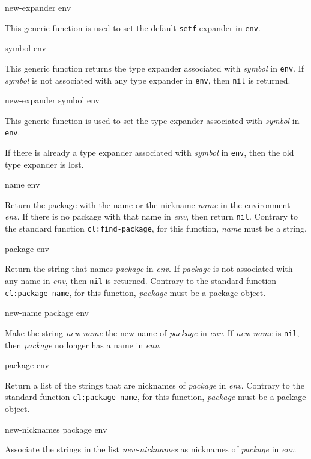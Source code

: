  {new-expander env}

This generic function is used to set the default \texttt{setf}
expander in \texttt{env}.

 {symbol env}

This generic function returns the type expander associated with
\textit{symbol} in \texttt{env}.  If \textit{symbol} is not associated
with any type expander in \texttt{env}, then \texttt{nil} is returned.

 {new-expander symbol env}

This generic function is used to set the type expander associated
with \textit{symbol} in \texttt{env}.

If there is already a type expander associated with \textit{symbol} in
\texttt{env}, then the old type expander is lost.

 {name env}

Return the package with the name or the nickname \textit{name} in the
environment \textit{env}.  If there is no package with that name
in \textit{env}, then return \texttt{nil}.  Contrary to
the standard \commonlisp{} function \texttt{cl:find-package}, for this
function, \textit{name} must be a string.

 {package env}

Return the string that names \textit{package} in \textit{env}.
If \textit{package} is not associated with any name in \textit{env},
then \texttt{nil} is returned.  Contrary to the standard \commonlisp{}
function \texttt{cl:package-name}, for this function, \textit{package}
must be a package object.

 {new-name package env}

Make the string \textit{new-name} the new name of \textit{package}
in \textit{env}.  If \textit{new-name} is \texttt{nil},
then \textit{package} no longer has a name in \textit{env}.

 {package env}

Return a list of the strings that are nicknames of \textit{package}
in \textit{env}.  Contrary to the standard \commonlisp{}
function \texttt{cl:package-name}, for this function, \textit{package}
must be a package object.

 {new-nicknames package env}

Associate the strings in the list \textit{new-nicknames} as nicknames
of \textit{package} in \textit{env}.
